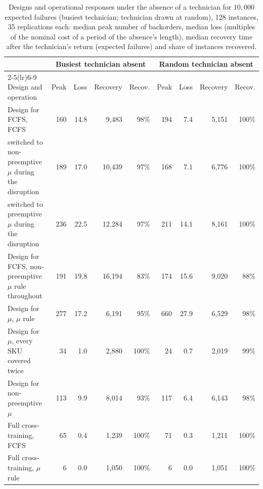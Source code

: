 \begin{table}[!htb]
\centering
\caption{Designs and operational responses under the absence of a technician for $10{,}000$ expected failures (busiest technician; technician drawn at random), 128 instances, 35 replications each: median peak number of backorders, median loss (multiples of the nominal cost of a period of the absence's length), median recovery time after the technician's return (expected failures) and share of instances recovered.}
\label{tab:absence_responses}
\small
\setlength{\tabcolsep}{4pt}
\begin{tabular}{@{}l rrrr rrrr@{}}
\toprule
& \multicolumn{4}{c}{Busiest technician absent} & \multicolumn{4}{c}{Random technician absent} \\ \cmidrule(lr){2-5}\cmidrule(lr){6-9} Design and operation & Peak & Loss & Recovery & Recov. & Peak & Loss & Recovery & Recov. \\
\midrule
Design for FCFS, FCFS & 160 & 14.8 & 9,483 & 98\% & 194 & 7.4 & 5,151 & 100\% \\
\quad switched to non-preemptive $\mu$ during the disruption & 189 & 17.0 & 10,439 & 97\% & 168 & 7.1 & 6,776 & 100\% \\
\quad switched to preemptive $\mu$ during the disruption & 236 & 22.5 & 12,284 & 97\% & 211 & 14.1 & 8,161 & 100\% \\
Design for FCFS, non-preemptive $\mu$ rule throughout & 191 & 19.8 & 16,194 & 83\% & 174 & 15.6 & 9,020 & 88\% \\
Design for $\mu$, $\mu$ rule & 277 & 17.2 & 6,191 & 95\% & 660 & 27.9 & 6,529 & 98\% \\
Design for $\mu$, every SKU covered twice & 34 & 1.0 & 2,880 & 100\% & 24 & 0.7 & 2,019 & 99\% \\
Design for non-preemptive $\mu$ & 113 & 9.9 & 8,014 & 93\% & 117 & 6.4 & 6,143 & 98\% \\
Full cross-training, FCFS & 65 & 0.4 & 1,239 & 100\% & 71 & 0.3 & 1,211 & 100\% \\
Full cross-training, $\mu$ rule & 6 & 0.0 & 1,050 & 100\% & 6 & 0.0 & 1,051 & 100\% \\
\bottomrule
\end{tabular}
\end{table}
